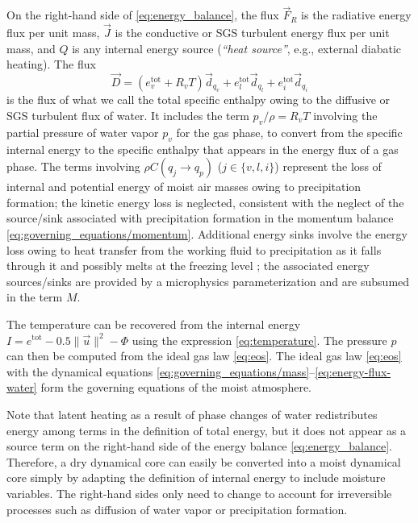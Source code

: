 \documentclass{report}
\begin{document}
On the right-hand side of \eqref{eq:energy_balance}, the flux $\vec{F}_R$ is the radiative energy flux per unit mass, $\vec{J}$ is the conductive or SGS turbulent energy flux per unit mass, and $Q$ is any internal energy source (\emph{``heat source''}, e.g., external diabatic heating). The flux 
\begin{equation}\label{eq:energy-flux-water}
\vec{D} = (e_v^{\mathrm{tot}} + R_v T) \vec{d}_{q_v} + e_l^{\mathrm{tot}} \vec{d}_{q_l} +  e_i^{\mathrm{tot}} \vec{d}_{q_i}
\end{equation}
is the flux of what we call the total specific enthalpy owing to the diffusive or SGS turbulent flux of water. It includes the term $p_v/\rho = R_v T$ involving the partial pressure of water vapor $p_v$ for the gas phase, to convert from the specific internal energy to the specific enthalpy that appears in the energy flux of a gas phase. The terms involving $\rho C(q_j \rightarrow q_p)$ ($j \in \{ v, l, i \}$) represent the loss of internal and potential energy of moist air masses owing to precipitation formation; the kinetic energy loss is neglected, consistent with the neglect of the source/sink associated with precipitation formation in the momentum balance \eqref{eq:governing_equations/momentum}. Additional energy sinks involve the energy loss owing to heat transfer from the working fluid to precipitation as it falls through it and possibly melts at the freezing level \citep{Raymond13b}; the associated energy sources/sinks are provided by a microphysics parameterization and are subsumed in the term $M$.

The temperature can be recovered from the internal energy $I = e^{\mathrm{tot}} - 0.5 \| \vec{u} \|^2 - \Phi$ using the expression \eqref{eq:temperature}. The pressure $p$ can then be computed from the ideal gas law \eqref{eq:eos}. The ideal gas law \eqref{eq:eos} with the dynamical equations \eqref{eq:governing_equations/mass}--\eqref{eq:energy-flux-water} form the governing equations of the moist atmosphere.

Note that latent heating as a result of phase changes of water redistributes energy among terms in the definition of total energy, but it does not appear as a source term on the right-hand side of the energy balance \eqref{eq:energy_balance}. Therefore, a dry dynamical core can easily be converted into a moist dynamical core simply by adapting the definition of internal energy to include moisture variables. The right-hand sides only need to change to account for irreversible processes such as diffusion of water vapor or precipitation formation. 
\end{document}
